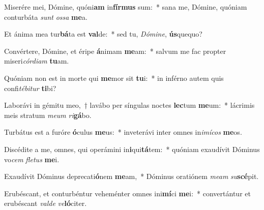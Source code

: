 \item Miserére mei, Dómine, quóni\textbf{am} in\textbf{fír}\textbf{mus} sum:~* sana me, Dómine, quóniam conturbáta \textit{sunt} \textit{os}\textit{sa} \textbf{me}a.
\item Et ánima mea tur\textbf{bá}ta est \textbf{val}de:~* sed tu, \textit{Dó}\textit{mi}\textit{ne}, \textbf{ús}quequo?
\item Convértere, Dómine, et éripe \textbf{á}nimam \textbf{me}am:~* salvum me fac propter miseri\textit{cór}\textit{di}\textit{am} \textbf{tu}am.
\item Quóniam non est in morte qui \textbf{me}mor sit \textbf{tu}i:~* in inférno autem quis confi\textit{té}\textit{bi}\textit{tur} \textbf{ti}bi?
\item Laborávi in gémitu meo,~† lavábo per síngulas noctes \textbf{lec}tum \textbf{me}um:~* lácrimis meis stratum \textit{me}\textit{um} \textit{ri}\textbf{gá}bo.
\item Turbátus est a furóre \textbf{ó}culus \textbf{me}us:~* inveterávi inter omnes in\textit{i}\textit{mí}\textit{cos} \textbf{me}os.
\item Discédite a me, omnes, qui operámini in\textbf{i}qui\textbf{tá}tem:~* quóniam exaudívit Dóminus vo\textit{cem} \textit{fle}\textit{tus} \textbf{me}i.
\item Exaudívit Dóminus deprecati\textbf{ó}nem \textbf{me}am,~* Dóminus oratiónem \textit{me}\textit{am} \textit{su}\textbf{scé}pit.
\item Erubéscant, et conturbéntur veheménter omnes ini\textbf{mí}ci \textbf{me}i:~* convertántur et erubéscant \textit{val}\textit{de} \textit{ve}\textbf{ló}citer.
